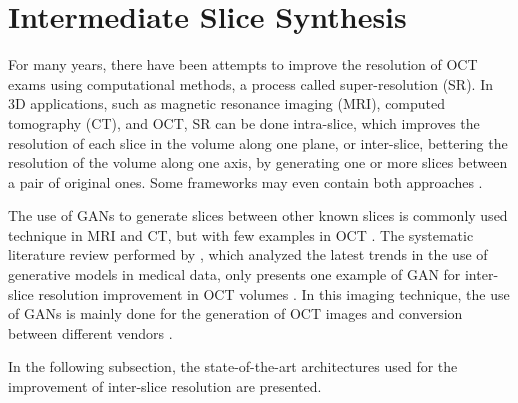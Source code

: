 \section{Intermediate Slice Synthesis}
For many years, there have been attempts to improve the resolution of OCT exams using computational methods, a process called super-resolution (SR). In 3D applications, such as magnetic resonance imaging (MRI), computed tomography (CT), and OCT, SR can be done intra-slice, which improves the resolution of each slice in the volume along one plane, or inter-slice, bettering the resolution of the volume along one axis, by generating one or more slices between a pair of original ones. Some frameworks may even contain both approaches \parencite{You2020}.
\par
The use of GANs to generate slices between other known slices is commonly used technique in MRI and CT, but with few examples in OCT \parencite{You2020}. The systematic literature review performed by \textcite{Ibrahim2024}, which analyzed the latest trends in the use of generative models in medical data, only presents one example of GAN for inter-slice resolution improvement in OCT volumes \parencite{Lopez2023}. In this imaging technique, the use of GANs is mainly done for the generation of OCT images and conversion between different vendors \parencite{Ibrahim2024}.
\par
In the following subsection, the state-of-the-art architectures used for the improvement of inter-slice resolution are presented.

